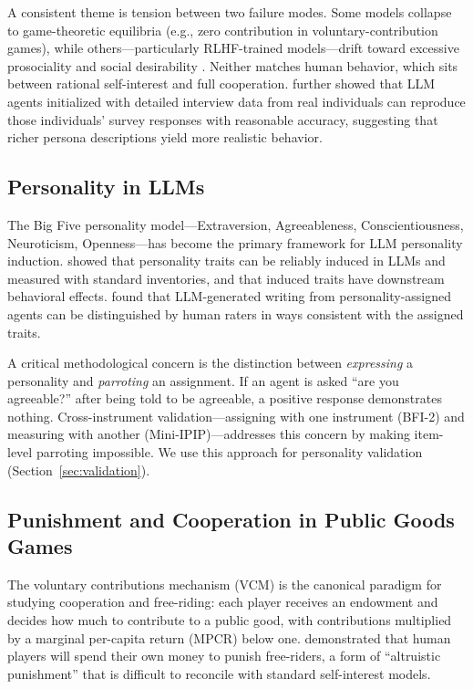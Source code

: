 \documentclass[12pt, a4paper]{article}
\begin{document}
A consistent theme is tension between two failure modes. Some models collapse to game-theoretic equilibria (e.g., zero contribution in voluntary-contribution games), while others---particularly RLHF-trained models---drift toward excessive prosociality and social desirability \citep{salecha2024social}. Neither matches human behavior, which sits between rational self-interest and full cooperation. \citet{park2024generative} further showed that LLM agents initialized with detailed interview data from real individuals can reproduce those individuals' survey responses with reasonable accuracy, suggesting that richer persona descriptions yield more realistic behavior.

\subsection{Personality in LLMs}

The Big Five personality model---Extraversion, Agreeableness, Conscientiousness, Neuroticism, Openness---has become the primary framework for LLM personality induction. \citet{serapio2023personality} showed that personality traits can be reliably induced in LLMs and measured with standard inventories, and that induced traits have downstream behavioral effects. \citet{jiang2024personallm} found that LLM-generated writing from personality-assigned agents can be distinguished by human raters in ways consistent with the assigned traits.

A critical methodological concern is the distinction between \emph{expressing} a personality and \emph{parroting} an assignment. If an agent is asked ``are you agreeable?'' after being told to be agreeable, a positive response demonstrates nothing. Cross-instrument validation---assigning with one instrument (BFI-2) and measuring with another (Mini-IPIP)---addresses this concern by making item-level parroting impossible. We use this approach for personality validation (Section~\ref{sec:validation}).

\subsection{Punishment and Cooperation in Public Goods Games}

The voluntary contributions mechanism (VCM) is the canonical paradigm for studying cooperation and free-riding: each player receives an endowment and decides how much to contribute to a public good, with contributions multiplied by a marginal per-capita return (MPCR) below one. \citet{fehr2002altruistic} demonstrated that human players will spend their own money to punish free-riders, a form of ``altruistic punishment'' that is difficult to reconcile with standard self-interest models.
\end{document}
